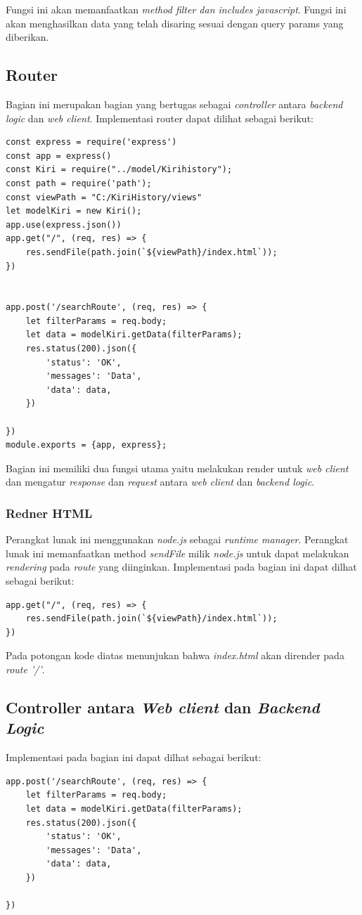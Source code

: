 Fungsi ini akan memanfaatkan \textit{method filter dan includes javascript}. Fungsi ini akan menghasilkan data yang telah disaring sesuai dengan query params yang diberikan.


\subsection{Router}
Bagian ini merupakan bagian yang bertugas sebagai \textit{controller} antara \textit{backend logic} dan \textit{web client}. Implementasi router dapat dilihat sebagai berikut:
\begin{lstlisting}[label=Router , caption=Router Implementation]
const express = require('express')
const app = express()
const Kiri = require("../model/Kirihistory");
const path = require('path');
const viewPath = "C:/KiriHistory/views"
let modelKiri = new Kiri();
app.use(express.json())
app.get("/", (req, res) => {
    res.sendFile(path.join(`${viewPath}/index.html`));
})


app.post('/searchRoute', (req, res) => {
    let filterParams = req.body;
    let data = modelKiri.getData(filterParams);
    res.status(200).json({
        'status': 'OK',
        'messages': 'Data',
        'data': data,
    })

})
module.exports = {app, express};
\end{lstlisting}
Bagian ini memiliki dua fungsi utama yaitu melakukan render untuk \textit{web client} dan mengatur \textit{response} dan \textit{request} antara \textit{web client} dan \textit{backend logic}.

\subsubsection{Redner HTML}
Perangkat lunak ini menggunakan \textit{node.js} sebagai \textit{runtime manager}. Perangkat lunak ini memanfaatkan method \textit{sendFile} milik \textit{node.js} untuk dapat melakukan \textit{rendering} pada \textit{route} yang diinginkan. Implementasi pada bagian ini dapat dilhat sebagai berikut:

\begin{lstlisting}[label=render_html , caption=Render HTML]
app.get("/", (req, res) => {
    res.sendFile(path.join(`${viewPath}/index.html`));
})
\end{lstlisting}
Pada potongan kode diatas menunjukan bahwa \textit{index.html} akan dirender pada \textit{route '/'}.

\subsection{Controller antara \textit{Web client} dan \textit{Backend Logic}}
Implementasi pada bagian ini dapat dilhat sebagai berikut:
\begin{lstlisting}[label=render_html , caption=Render HTML]
app.post('/searchRoute', (req, res) => {
    let filterParams = req.body;
    let data = modelKiri.getData(filterParams);
    res.status(200).json({
        'status': 'OK',
        'messages': 'Data',
        'data': data,
    })

})
\end{lstlisting}


